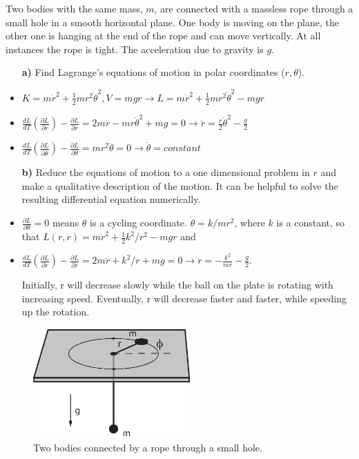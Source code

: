 \documentclass[11pt,a4paper]{report}
\newcounter{excount}[chapter]
\newenvironment{exercise}[1][]{\addtocounter{excount}{1} \noindent {\bf Problem
    \arabic{excount} \ \ #1}\hspace{2mm}}{\vspace{4mm}}
\begin{document}
\begin{exercise}
Two bodies with the same mass, $m$, are connected with a massless rope through a small hole in a smooth horizontal plane. One body is moving on the plane, the other one is hanging at the end of the rope and can move vertically. At all instances
the rope is tight. The acceleration due to gravity is $g$.

\begin{itemize}
\item[\bf a)] Find Lagrange's equations of motion in polar coordinates ($r,\theta$). 

\item  $K=m\dot{r}^2+\frac{1}{2}mr^2\dot{\theta}^2, V=mgr \rightarrow L=m\dot{r}^2+\frac{1}{2}mr^2\dot{\theta}^2-mgr$
\item $\frac{dL}{dT}(\frac{\partial L}{\partial \dot{r}})-\frac{\partial{L}}{\partial r}=2m\ddot{r}-mr\dot{\theta}^2+mg=0 \rightarrow \ddot{r}=\frac{r}{2}\dot{\theta}^2-\frac{g}{2}$

\item $\frac{dL}{dT}(\frac{\partial L}{\partial \dot{\theta}})-\frac{\partial {L}}{\partial \theta}=mr^2\ddot{\theta}=0\rightarrow \dot{\theta}=constant$



\item[\bf b)] Reduce the equations of motion to a one dimensional problem in $r$ 
and make a qualitative description of the motion. It can be helpful to solve the resulting differential equation numerically.
\item $\frac{\partial L}{\partial \theta}=0$ means $\theta$ is a cycling coordinate. $\dot{\theta}=k/mr^2$, where $k$ is a constant, so that $L(r,\dot{r})=m\dot{r}^2+\frac{1}{2}k^2/r^2-mgr$ and \item $\frac{dL}{dT}(\frac{\partial L}{\partial \dot{r}})-\frac{\partial{L}}{\partial r}=2m\ddot{r}+k^2/r+mg=0 \rightarrow \ddot{r}=-\frac{k^2}{mr}-\frac{g}{2}$. 

Initially, r will decrease slowly while the ball on the plate is rotating with increasing speed. Eventually, r will decrease faster and faster, while speeding up the rotation. 
\end{itemize}

\begin{figure}[h!]
\begin{center}
\includegraphics[width=6cm]{KlossOgKule.eps}
\end{center}
\caption{Two bodies connected by a rope through a small hole.}
\end{figure}

\end{exercise}
\end{document}
